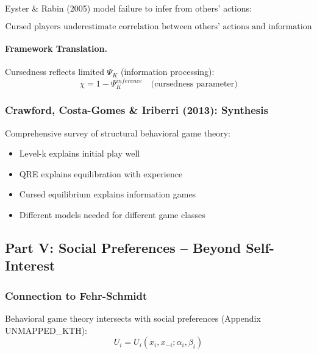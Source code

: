 Eyster \& Rabin (2005) model failure to infer from others' actions:

\begin{equation}
\boxed{
\text{Cursed players underestimate correlation between others' actions and information}
}
\label{eq:cursed}
\end{equation}

\paragraph{Framework Translation.}
Cursedness reflects limited $\Psi_K$ (information processing):
\begin{equation}
\chi = 1 - \Psi_K^{inference} \quad \text{(cursedness parameter)}
\end{equation}

\subsubsection{Crawford, Costa-Gomes \& Iriberri (2013): Synthesis}

Comprehensive survey of structural behavioral game theory:
\begin{itemize}
    \item Level-k explains initial play well
    \item QRE explains equilibration with experience
    \item Cursed equilibrium explains information games
    \item Different models needed for different game classes
\end{itemize}

\subsection{Part V: Social Preferences – Beyond Self-Interest}

\subsubsection{Connection to Fehr-Schmidt}

Behavioral game theory intersects with social preferences (Appendix UNMAPPED_KTH):
\begin{equation}
U_i = U_i(x_i, x_{-i}; \alpha_i, \beta_i)
\end{equation}


